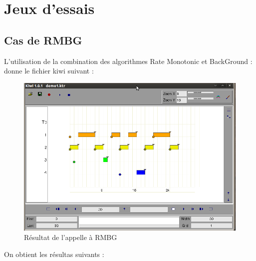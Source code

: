 \chapter{Jeux d'essais}
\section{Cas de RMBG}
L'utilisation de la combination des algorithmes Rate Monotonic et BackGround : donne  le fichier kiwi suivant : 
\begin{figure}[htbp]
  \centering
  \includegraphics[scale=0.60]{img/RMBG}
  \caption{Résultat de l'appelle à RMBG}
  \label{fig:RMBG}
\end{figure}
On obtient les résultas suivants : 

